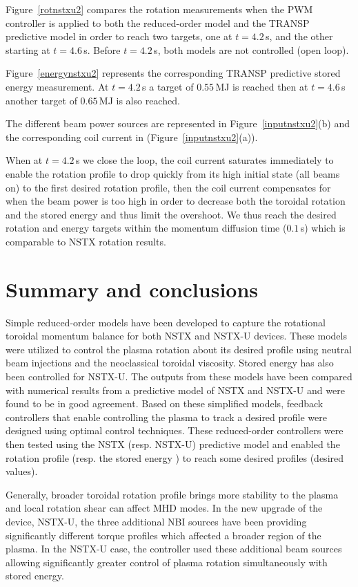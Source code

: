 \documentclass[12pt,lot, lof]{puthesis}
\begin{document}
Figure~\ref{rotnstxu2} compares the rotation measurements when the PWM controller is applied to both the reduced-order model and the TRANSP predictive model in order to reach two targets, one at $t = 4.2$\,s, and the other starting at $t=4.6$\,s. Before $t=4.2$\,s, both models are not controlled (open loop).

Figure~\ref{energynstxu2} represents the corresponding TRANSP predictive stored energy measurement.
At $t = 4.2$\,s a target of $0.55$\,MJ is reached then at $t=4.6$\,s another target of $0.65$\,MJ is also reached.

The different beam power sources are represented in Figure~\ref{inputnstxu2}(b) and the corresponding coil current in (Figure~\ref{inputnstxu2}(a)). 

When at $t = 4.2$\,s we close the loop, the coil current saturates immediately to enable the rotation profile to drop quickly from its high initial state (all beams on) to the first desired rotation profile, then the coil current compensates for when the beam power is too high in order to decrease both the toroidal rotation and the stored energy and thus limit the overshoot. We thus reach the desired rotation and energy targets within the momentum diffusion time ($0.1$\,s) which is comparable to NSTX rotation results.



\section{Summary and conclusions}

Simple reduced-order models have been developed to capture the rotational toroidal momentum balance for both NSTX and NSTX-U devices. These models were utilized to control the plasma rotation about its desired profile using neutral beam injections and the neoclassical toroidal viscosity. Stored energy has also been controlled for NSTX-U. The outputs from these models have been compared with numerical results from a predictive model of NSTX and NSTX-U and were found to be in good agreement. Based on these simplified models, feedback controllers that enable controlling the plasma to track a desired profile were designed using optimal control techniques. These reduced-order controllers were then tested using the NSTX (resp. NSTX-U) predictive model and enabled the rotation profile (resp. the stored energy ) to reach some desired profiles (desired values).

Generally, broader toroidal rotation profile brings more stability to the plasma and local rotation shear can affect MHD modes. In the new upgrade of the device, NSTX-U, the three additional NBI sources have been providing significantly different torque profiles which affected a broader region of the plasma. In the NSTX-U case, the controller used these additional beam sources allowing significantly greater control of plasma rotation simultaneously with stored energy. 
\end{document}
